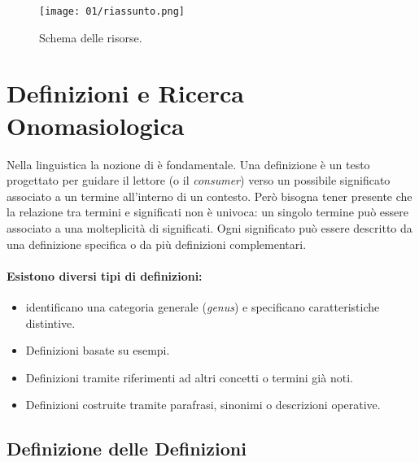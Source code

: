 \begin{figure}[h]
    \centering
    \texttt{[image: 01/riassunto.png]}
    \caption{Schema delle risorse.}
\end{figure}

\section{Definizioni e Ricerca Onomasiologica}

Nella linguistica la nozione di  è fondamentale. Una definizione è un testo progettato per guidare il lettore (o il \textit{consumer}) verso un possibile significato associato a un termine all'interno di un contesto. Però bisogna tener presente che la relazione tra termini e significati non è univoca: un singolo termine può essere associato a una molteplicità di significati. Ogni significato può essere descritto da una definizione specifica o da più definizioni complementari. 

\paragraph{Esistono diversi tipi di definizioni:}

\begin{itemize}
  \item {} identificano una categoria generale (\textit{genus}) e specificano caratteristiche distintive.
  \item Definizioni basate su esempi. 
  \item Definizioni tramite riferimenti ad altri concetti o termini già noti. 
  \item Definizioni costruite tramite parafrasi, sinonimi o descrizioni operative.
\end{itemize}



\subsection{Definizione delle Definizioni}

